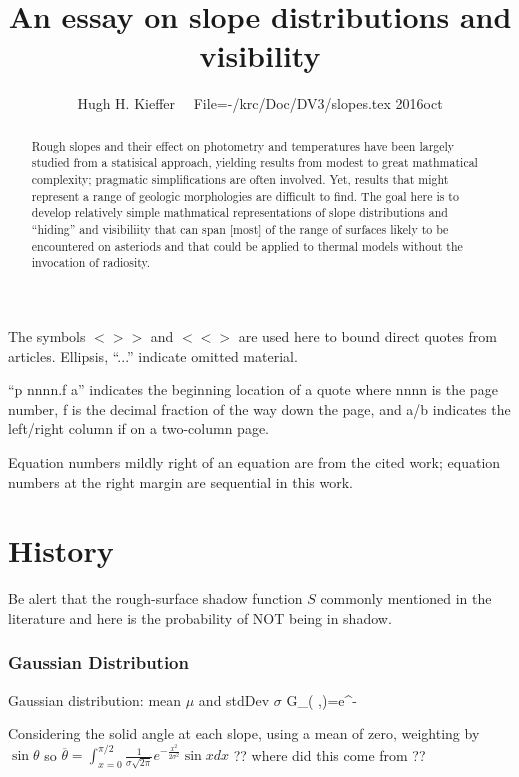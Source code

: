 \documentclass{article}
\title{An essay on slope distributions and visibility}
\author{Hugh H. Kieffer  \ \ File=-/krc/Doc/DV3/slopes.tex  2016oct}
\newcommand{\bq}{$ < \! > \!   \! >$ } %
\newcommand{\eq}{ $< \! \! < \! > $ } %
\begin{document}
\maketitle
\tableofcontents
\listoffigures
\begin{abstract}
 Rough slopes and their effect on photometry and temperatures have been largely
 studied from a statisical approach, yielding results from modest to great
 mathmatical complexity; pragmatic simplifications are often involved. Yet,
 results that might represent a range of geologic morphologies are difficult to
 find. The goal here is to develop relatively simple mathmatical representations
 of slope distributions and ``hiding'' and visibiliity that can span [most] of
 the range of surfaces likely to be encountered on asteriods and that could
 be applied to thermal models without the invocation of radiosity.
\end{abstract}

The symbols \bq and \eq are used here to bound direct quotes from
articles. Ellipsis, ``...'' indicate omitted material.

``p nnnn.f a'' indicates the beginning location of a quote where nnnn is the
page number, f is the decimal fraction of the way down the page, and a/b
indicates the left/right column if on a two-column page.

Equation numbers mildly right of an equation are from the cited work; equation
numbers at the right margin are sequential in this work.

\section{History}

Be alert that the rough-surface shadow function $S$ commonly mentioned in the literature and here is the probability of NOT being in shadow.

\subsubsection{Gaussian Distribution}

Gaussian distribution: mean $\mu$ and stdDev $\sigma$
\qb G_{( \sigma,\mu )}=e^{-} \qe


Considering the solid angle at each slope, using a mean of zero, 
weighting by $\sin \theta$ 
so $\overline{\theta}=\int_{x=0}^{\pi/2} \frac{1}{\sigma \sqrt{2 \pi}}e^{-\frac{x^2}{2 \sigma^2}} \sin x dx $  ?? where did this come from ??
\end{document}
